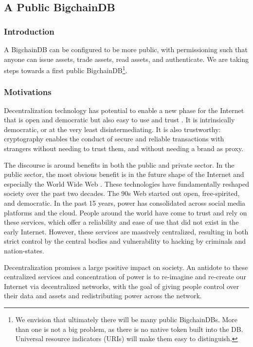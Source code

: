 \subsection{A Public BigchainDB}\label{subsec:permissioning_public}
\subsubsection{Introduction}
A BigchainDB can be configured to be more public, with permissioning such that anyone can issue assets, trade assets, read assets, and authenticate. 
We are taking steps towards a first public BigchainDB\footnote{We envision that ultimately there will be many public BigchainDBs. More than one is not a big problem, as there is no native token built into the DB. Universal resource indicators (URIs) will make them easy to distinguish.}.

\subsubsection{Motivations}

Decentralization technology has potential to enable a new phase for the Internet that is open and democratic but also easy to use and trust \cite{swan2015blockchain}\cite{andreesen2014bitcoin}\cite{monegro2014blockchain_stack}.
It is intrinsically democratic, or at the very least disintermediating.
It is also trustworthy: cryptography enables the conduct of secure and reliable transactions with strangers without needing to trust them, and without needing a brand as proxy.

The discourse is around benefits in both the public and private sector.
In the public sector, the most obvious benefit is in the future shape of the Internet and especially the World Wide Web \cite{berners1989information_mgmnt}.
These technologies have fundamentally reshaped society over the past two decades. The 90s Web started out open, free-spirited, and democratic. 
In the past 15 years, power has consolidated across social media platforms and the cloud.
People around the world have come to trust and rely on these services, which offer a reliability and ease of use that did not exist in the early Internet. 
However, these services are massively centralized, resulting in both strict control by the central bodies and vulnerability to hacking by criminals and nation-states.

Decentralization promises a large positive impact on society. 
An antidote to these centralized services and concentration of power is to re-imagine and re-create our Internet via decentralized networks, with the goal of giving people control over their data and assets and redistributing power across the network.

